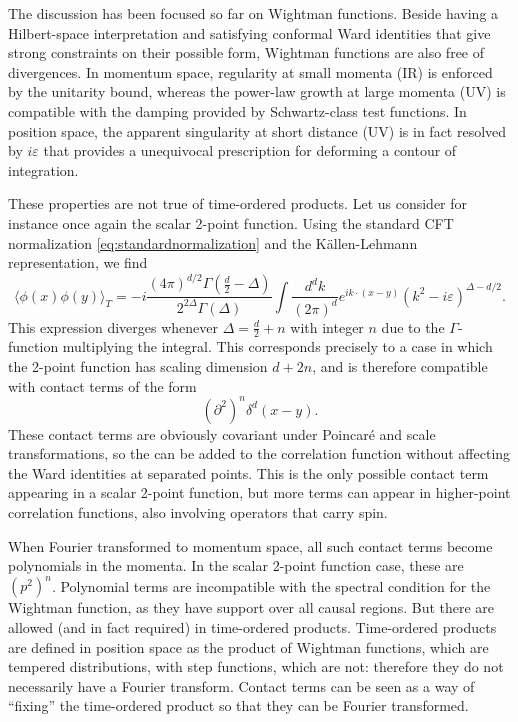 \documentclass[a4paper,12pt]{article}
\numberwithin{equation}{section}
\begin{document}
The discussion has been focused so far on Wightman functions. Beside having a Hilbert-space interpretation and satisfying conformal Ward identities that give strong constraints on their possible form, Wightman functions are also free of divergences.
In momentum space, regularity at small momenta (IR) is enforced by the unitarity bound, whereas the power-law growth at large momenta (UV) is compatible with the damping provided by Schwartz-class test functions.
In position space, the apparent singularity at short distance (UV) is in fact resolved by $i \varepsilon$ that provides a unequivocal prescription for deforming a contour of integration.

These properties are not true of time-ordered products. Let us consider for instance once again the scalar 2-point function. Using the standard CFT normalization \eqref{eq:standardnormalization} and the Källen-Lehmann representation, we find
\begin{equation}
	\langle \phi(x) \phi(y) \rangle_T
	= -i
	\frac{(4\pi)^{d/2} \Gamma\left( \frac{d}{2} - \Delta \right)}
	{2^{2\Delta} \Gamma(\Delta)}
	\int \frac{d^dk}{(2\pi)^d}
	e^{i k \cdot (x - y)}
	\left( k^2 - i \varepsilon \right)^{\Delta - d/2}.
	\label{eq:UVdivergence}
\end{equation}
This expression diverges whenever $\Delta = \frac{d}{2} + n$ with integer $n$ due to the $\Gamma$-function multiplying the integral.
This corresponds precisely to a case in which the 2-point function has scaling dimension $d + 2n$, and is therefore compatible with contact terms of the form
\begin{equation}
	(\partial^2)^n \delta^d(x - y).
\end{equation}
These contact terms are obviously covariant under Poincaré and scale transformations, so the can be added to the correlation function without affecting the Ward identities at separated points.
This is the only possible contact term appearing in a scalar 2-point function, but more terms can appear in higher-point correlation functions, also involving operators that carry spin.

When Fourier transformed to momentum space, all such contact terms become polynomials in the momenta. In the scalar 2-point function case, these are $(p^2)^n$. Polynomial terms are incompatible with the spectral condition for the Wightman function, as they have support over all causal regions. But there are allowed (and in fact required) in time-ordered products. Time-ordered products are defined in position space as the product of Wightman functions, which are tempered distributions, with step functions, which are not: therefore they do not necessarily have a Fourier transform. Contact terms can be seen as a way of ``fixing'' the time-ordered product so that they can be Fourier transformed. 
\end{document}
